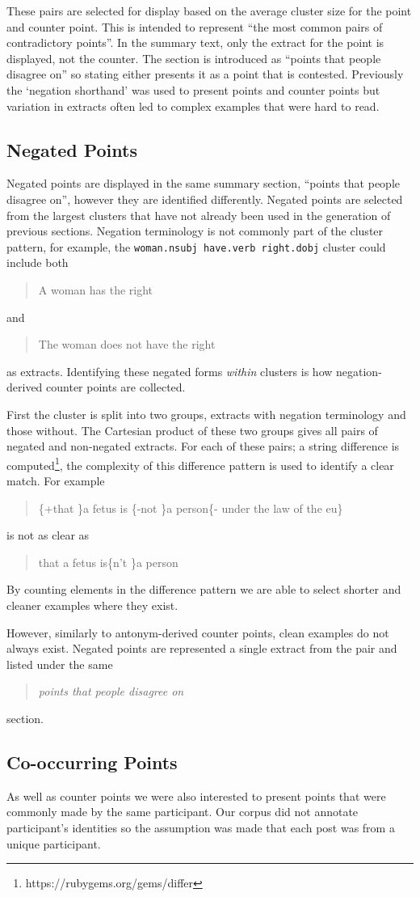       These pairs are selected for display based on the average cluster size for the point and counter point. This is intended to represent ``the most common pairs of contradictory points''. In the summary text, only the extract for the point is displayed, not the counter. The section is introduced as ``points that people disagree on'' so stating either presents it as a point that is contested. Previously the `negation shorthand' was used to present points and counter points but variation in extracts often led to complex examples that were hard to read.

    \subsection{Negated Points \label{neg-points}}
      Negated points are displayed in the same summary section, ``points that people disagree on'', however they are identified differently. Negated points are selected from the largest clusters that have not already been used in the generation of previous sections. Negation terminology is not commonly part of the cluster pattern, for example, the \texttt{woman.nsubj have.verb right.dobj} cluster could include both \blockquote{A woman has the right} and \blockquote{The woman does not have the right} as extracts. Identifying these negated forms \textit{within} clusters is how negation-derived counter points are collected.

      First the cluster is split into two groups, extracts with negation terminology and those without. The Cartesian product of these two groups gives all pairs of negated and non-negated extracts. For each of these pairs; a string difference is computed\footnote{https://rubygems.org/gems/differ}, the complexity of this difference pattern is used to identify a clear match. For example \blockquote{\{+that \}a fetus is \{-not \}a person\{- under the law of the eu\}} is not as clear as \blockquote{that a fetus is\{n't \}a person}. By counting elements in the difference pattern we are able to select shorter and cleaner examples where they exist.

      However, similarly to antonym-derived counter points, clean examples do not always exist. Negated points are represented a single extract from the pair and listed under the same \blockquote{\textit{points that people disagree on}} section.

    \subsection{Co-occurring Points}
      As well as counter points we were also interested to present points that were commonly made by the same participant. Our corpus did not annotate participant's identities so the assumption was made that each post was from a unique participant.

